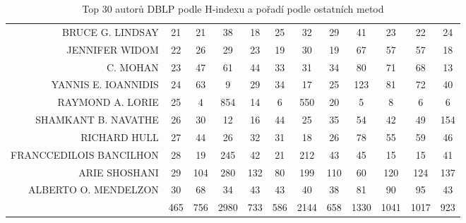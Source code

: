 \documentclass{bakalarka}
\begin{document}
\begin{table}[!ht]
\begin{center}
{\begin{footnotesize}
\begin{tabular}{r|ccccccccccc}
BRUCE G. LINDSAY&21&21&38&18&25&32&29&41&23&22&24\\
JENNIFER WIDOM&22&26&29&23&19&30&19&67&57&57&18\\
C. MOHAN&23&47&61&44&33&31&34&80&71&68&13\\
YANNIS E. IOANNIDIS&24&63&9&29&34&17&25&123&81&72&40\\
RAYMOND A. LORIE&25&4&854&14&6&550&20&5&8&6&6\\
SHAMKANT B. NAVATHE&26&30&12&16&44&25&35&54&42&49&154\\
RICHARD HULL&27&44&26&32&31&18&26&78&55&59&46\\
FRANCCEDILOIS BANCILHON&28&19&245&42&21&212&43&45&15&15&41\\
ARIE SHOSHANI&29&104&280&132&80&199&110&60&120&124&137\\
ALBERTO O. MENDELZON&30&68&34&43&43&40&38&81&90&95&43\\
\midrule
&465&756&2980&733&586&2144&658&1330&1041&1017&923\\
\bottomrule
\end{tabular}
\end{footnotesize}
}
\end{center}
\caption{Top 30 autorů DBLP podle H-indexu a pořadí podle ostatních metod}
\label{tab:ranks1}
\end{table}
\end{document}
